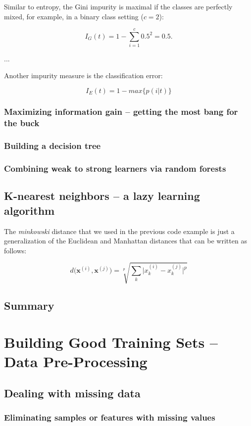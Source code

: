 \documentclass[letterpaper]{report}
\begin{document}
Similar to entropy, the Gini impurity is maximal if the classes are perfectly mixed, for example, in a binary class setting ($c = 2 $):

\[
I_G(t) = 1 - \sum_{i=1}^{c} 0.5^2 = 0.5.
\]

...

Another impurity measure is the classification error:

\[
I_E(t) = 1 - max \{ p(i|t) \}
\]

\subsection{Maximizing information gain -- getting the most bang for the buck}
\subsection{Building a decision tree}
\subsection{Combining weak to strong learners via random forests}
\section{K-nearest neighbors -- a lazy learning algorithm}

The \textit{minkowski} distance that we used in the previous code example is just a generalization of the Euclidean and Manhattan distances that can be written as follows:

\[
d \big(\mathbf{x}^{(i)}, \mathbf{x}^{(j)}\big) =  \sqrt[p]{\sum_k \big| x_{k}^{(i)} - x_{k}^{(j)} \big|^p } 
\]


\section{Summary}






\chapter{Building Good Training Sets -- Data Pre-Processing}

\section{Dealing with missing data}
\subsection{Eliminating samples or features with missing values}
\end{document}
